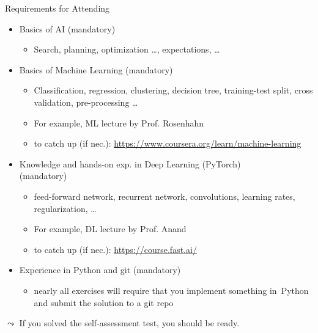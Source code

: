 \documentclass[aspectratio=169]{../latex_main/tntbeamer}  %
\begin{document}
\begin{frame}[c]{Requirements for Attending}
	
	\begin{itemize}
		\item Basics of \alert{AI} (mandatory)
		\begin{itemize}
			\item Search, planning, optimization \ldots, expectations, \ldots
		\end{itemize}
		\pause
		\item Basics of \alert{Machine Learning} (mandatory)
		\begin{itemize}
			\item Classification, regression, clustering, decision tree, training-test split, cross validation, pre-processing \ldots
			\item For example, ML lecture by Prof. Rosenhahn
			\item to catch up (if nec.):
			\url{https://www.coursera.org/learn/machine-learning} 
		\end{itemize}
		\pause
		\item Knowledge and hands-on exp. in \alert{Deep Learning} (PyTorch)\\ (mandatory)
		\begin{itemize}
			\item feed-forward network, recurrent network, convolutions, learning rates, regularization, \ldots 
			\item For example, DL lecture by Prof. Anand
			\item to catch up (if nec.): \url{https://course.fast.ai/}
		\end{itemize}
		\pause
		\item Experience in \alert{Python and git} (mandatory)
		\begin{itemize}
			\item nearly all exercises will require 
			that you implement something in~Python and submit the solution to a git repo
		\end{itemize}
	\end{itemize}
	\pause
	$\leadsto$ If you solved the self-assessment test, you should be ready.
	
\end{frame}
\end{document}
